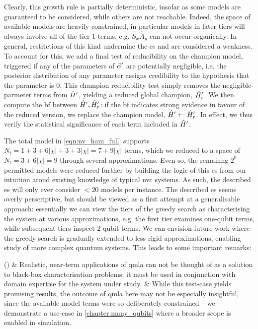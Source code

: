 Clearly, this growth rule is partially deterministic, insofar as some models are guaranteed to be considered, 
    while others are not reachable.
Indeed, the space of available models are heavily constrained, in particular models in later tiers will 
    always involve all of the tier 1 terms, e.g. $\hat{S}_{x}\hat{A}_{y}$ can not occur organically. 
In general, restrictions of this kind undermine the \gls{es} and are considered a weakness.
To account for this, we add a final test of reducibility on the \gls{champion model}, 
    triggered if any of the parameters of $\vec{\alpha}^{\prime}$ are potentially negligible, 
    i.e. the posterior distribution of any parameter assigns credibility to the hypothesis that the parameter is 0.
This champion reducibility test simply removes the negligible-parmeter terms from $\hat{H}^{\prime}$, 
    yielding a reduced global champion, $\hat{H}^{\prime}_r$.
We then compute the \gls{bf} between $\hat{H}^{\prime}, \hat{H}^{\prime}_r$: 
    if the \gls{bf} indicates strong evidence in favour of the reduced version, 
    we replace the \gls{champion model}, $\hat{H}^{\prime} \gets \hat{H}^{\prime}_r$. 
In effect, we thus verify the statistical significance of each term included in $\hat{H}^{\prime}$. 
\par 

The total model in \cref{eqn:nv_ham_full} supports $N_t = 1 + 3 + 6 | \chi | + 3 + 3 |\chi| = 7 + 9|\chi| $ terms, 
    which we reduced to a space of $N_t=3 + 6 |\chi| = 9$ through several approximations.
Even so, the remainng $2^9$ permitted models were reduced further by building the logic of this \gls{es} 
    from our intuition aroud existing knowledge of typical \gls{nvc} systems.
As such, the described \gls{es} will only ever consider $<20$ models per instance. 
The described \gls{es} seems overly perscriptive, 
    but should be viewed as a first attempt at a generalisable approach: 
    essentially we can view the tiers of the greedy search as characterising the system 
    at various approximations, 
    e.g. the first tier examines one-qubit terms, while subsequent tiers inspect $2$-qubit terms. 
We can envision future work where the greedy search is gradually extended to less rigid approximations, 
    enabling study of more complex quantum systems.     
This leads to some important remarks:

\begin{easylist}[enumerate]
    \ListProperties()
    & Realistic, near-term applications of \gls{qmla} can not be thought of as a solution to black-box characterisation problems: 
        it must be used in conjunction with domain expertise for the system under study.
    & While this test-case yields promising results, the outcome of \gls{qmla} here may not be especially insightful, 
        since the available model terms were so deliberately constrained -- we demonstrate a use-case in \cref{chapter:many_qubits} 
        where a broader scope is enabled in simulation.    
\end{easylist}   
\par 

